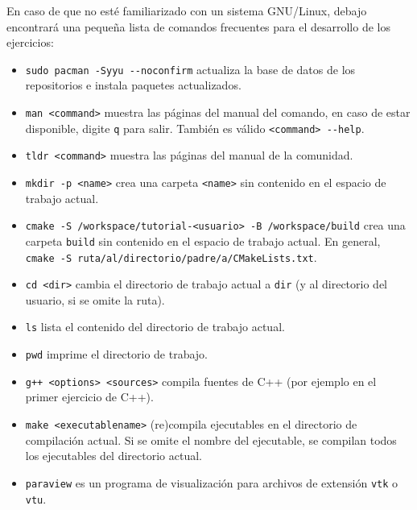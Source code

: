 \documentclass[9pt,a3paper]{scrartcl}
\begin{document}
En caso de que no esté familiarizado con un sistema GNU/Linux, debajo
encontrará una pequeña lista de comandos frecuentes para el
desarrollo de los ejercicios:
\begin{itemize}
	\item

	      \verb!sudo pacman -Syyu --noconfirm! actualiza la base de
	      datos de los repositorios e instala paquetes actualizados.

	\item

	      \verb!man <command>! muestra las páginas del manual del
	      comando, en caso de estar disponible, digite \verb!q! para
	      salir.
	      También es válido \verb!<command> --help!.

	\item

	      \verb!tldr <command>! muestra las páginas del manual de la
	      comunidad.

	\item

	      \verb!mkdir -p <name>! crea una carpeta \verb!<name>! sin
	      contenido en el espacio de trabajo actual.

	\item

	      \verb!cmake -S /workspace/tutorial-<usuario> -B /workspace/build!
	      crea una carpeta
	      \verb!build! sin contenido en el espacio de trabajo actual.
	      En general, \verb!cmake -S ruta/al/directorio/padre/a/CMakeLists.txt!.

	\item

	      \verb!cd <dir>! cambia el directorio de trabajo actual
	      a \verb!dir! (y al directorio del usuario, si se omite la ruta).

	\item

	      \verb!ls! lista el contenido del directorio de trabajo actual.

	\item

	      \verb!pwd! imprime el directorio de trabajo.

	\item

	      \verb!g++ <options> <sources>! compila fuentes de C++
	      (por ejemplo en el primer ejercicio de C++).

	\item

	      \verb!make <executablename>! (re)compila ejecutables en el
	      directorio de compilación actual.
	      Si se omite el nombre del ejecutable, se compilan todos los
	      ejecutables del directorio actual.

	\item

	      \verb!paraview! es un programa de visualización para archivos
	      de extensión
	      \verb!vtk! o \verb!vtu!.
\end{itemize}
\end{document}
